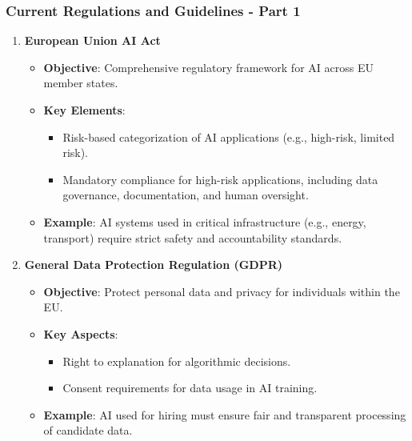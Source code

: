 \documentclass{beamer}
\begin{document}
\begin{frame}[fragile]
    \frametitle{Current Regulations and Guidelines - Part 1}
    \begin{enumerate}
        \item \textbf{European Union AI Act}
            \begin{itemize}
                \item \textbf{Objective}: Comprehensive regulatory framework for AI across EU member states.
                \item \textbf{Key Elements}:
                    \begin{itemize}
                        \item Risk-based categorization of AI applications (e.g., high-risk, limited risk).
                        \item Mandatory compliance for high-risk applications, including data governance, documentation, and human oversight.
                    \end{itemize}
                \item \textbf{Example}: AI systems used in critical infrastructure (e.g., energy, transport) require strict safety and accountability standards.
            \end{itemize}
        
        \item \textbf{General Data Protection Regulation (GDPR)}
            \begin{itemize}
                \item \textbf{Objective}: Protect personal data and privacy for individuals within the EU.
                \item \textbf{Key Aspects}:
                    \begin{itemize}
                        \item Right to explanation for algorithmic decisions.
                        \item Consent requirements for data usage in AI training.
                    \end{itemize}
                \item \textbf{Example}: AI used for hiring must ensure fair and transparent processing of candidate data.
            \end{itemize}
    \end{enumerate}
\end{frame}
\end{document}
